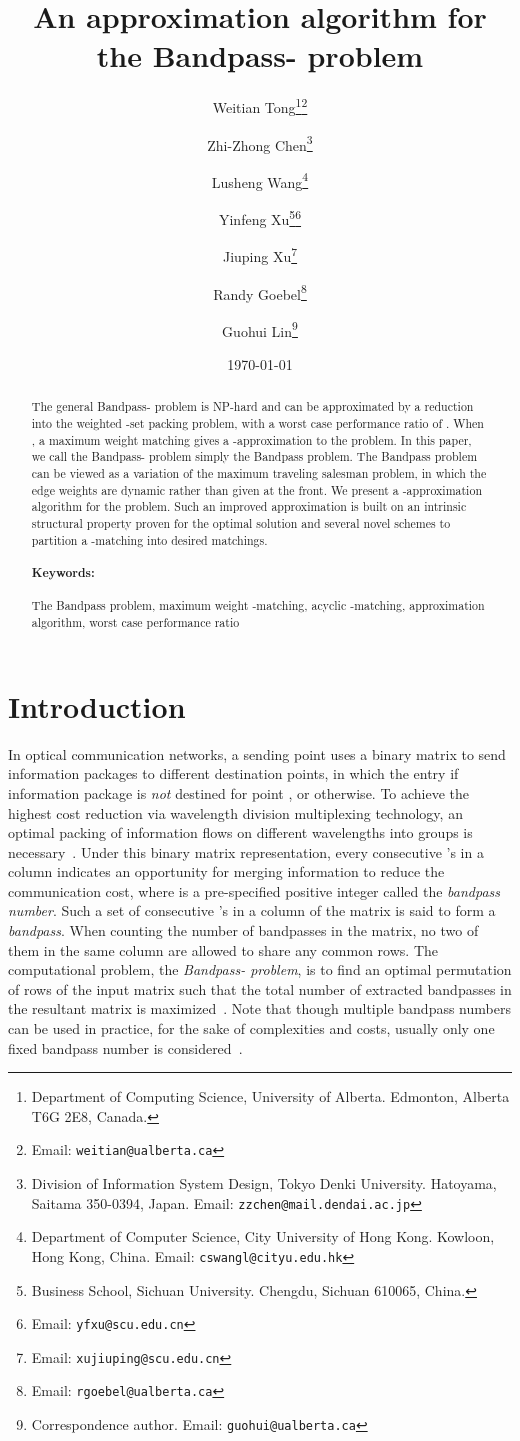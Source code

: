 \documentclass[11pt,twoside]{article}\usepackage{amssymb,latexsym,graphicx,hyperref}\usepackage{epstopdf}
\title{An approximation algorithm for the Bandpass- problem}
\author{Weitian Tong\thanks{Department of Computing Science, University of Alberta.
Edmonton, Alberta T6G 2E8, Canada.}\thanks{Email: {\tt weitian@ualberta.ca}}
\and
Zhi-Zhong Chen\thanks{Division of Information System Design, Tokyo Denki University.
Hatoyama, Saitama 350-0394, Japan.
Email: {\tt zzchen@mail.dendai.ac.jp}}
\and
Lusheng Wang\thanks{Department of Computer Science, City University of Hong Kong.
Kowloon, Hong Kong, China.
Email: {\tt cswangl@cityu.edu.hk}}
\and
Yinfeng Xu\thanks{Business School, Sichuan University.
Chengdu, Sichuan 610065, China.}\thanks{Email: {\tt yfxu@scu.edu.cn}}
\and
Jiuping Xu\thanks{Email: {\tt xujiuping@scu.edu.cn}}
\and
Randy Goebel\thanks{Email: {\tt rgoebel@ualberta.ca}}
\and
Guohui Lin\thanks{Correspondence author.  Email: {\tt guohui@ualberta.ca}}}
\date{\today}
\begin{document}
\maketitle
\begin{abstract}
The general Bandpass- problem is NP-hard and can be approximated by a reduction into the weighted -set packing problem,
with a worst case performance ratio of .
When , a maximum weight matching gives a -approximation to the problem.
In this paper, we call the Bandpass- problem simply the Bandpass problem.
The Bandpass problem can be viewed as a variation of the maximum traveling salesman problem,
in which the edge weights are dynamic rather than given at the front.
We present a -approximation algorithm for the problem.
Such an improved approximation is built on an intrinsic structural property proven for the optimal solution and
several novel schemes to partition a -matching into desired matchings.

\paragraph{Keywords:}
The Bandpass problem, maximum weight -matching, acyclic -matching, approximation algorithm, worst case performance ratio
\end{abstract}



\section{Introduction}
In optical communication networks,
a sending point uses a binary matrix  to send  information packages to  different destination points,
in which the entry  if information package  is {\em not} destined for point , or  otherwise.
To achieve the highest cost reduction via wavelength division multiplexing technology,
an optimal packing of information flows on different wavelengths into groups is necessary~\cite{BBN09}. 
Under this binary matrix representation,
every  consecutive 's in a column indicates an opportunity for merging information to reduce the communication cost,
where  is a pre-specified positive integer called the {\em bandpass number}.
Such a set of  consecutive 's in a column of the matrix is said to form a {\em bandpass}.
When counting the number of bandpasses in the matrix, no two of them in the same column are allowed to share any common rows.
The computational problem, the {\em Bandpass- problem},
is to find an optimal permutation of rows of the input matrix 
such that the total number of extracted bandpasses in the resultant matrix is maximized~\cite{BB04,BBN09,Lin11}.
Note that though multiple bandpass numbers can be used in practice, for the sake of complexities and costs,
usually only one fixed bandpass number is considered~\cite{BBN09}.
\end{document}
